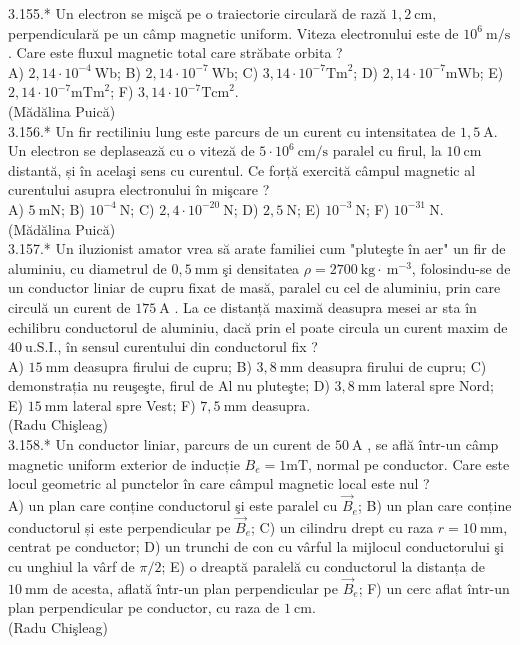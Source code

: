 3.155.* Un electron se mişcă pe o traiectorie circulară de rază $1,2 \mathrm{~cm}$, perpendiculară pe un câmp magnetic uniform. Viteza electronului este de $10^{6} \mathrm{~m} / \mathrm{s}$. Care este fluxul magnetic total care străbate orbita ?\\ A) $2,14 \cdot 10^{-4} \mathrm{~Wb}$; B) $2,14 \cdot 10^{-7} \mathrm{~Wb}$; C) $3,14 \cdot 10^{-7} \mathrm{Tm}^{2}$; D) $2,14 \cdot 10^{-7} \mathrm{mWb}$; E) $2,14 \cdot 10^{-7} \mathrm{mTm}^{2}$; F) $3,14 \cdot 10^{-7} \mathrm{Tcm}^{2}$.\\ (Mădălina Puică)\\

3.156.* Un fir rectiliniu lung este parcurs de un curent cu intensitatea de $1,5 \mathrm{~A}$. Un electron se deplasează cu o viteză de $5 \cdot 10^{6} \mathrm{~cm} / \mathrm{s}$ paralel cu firul, la $10 \mathrm{~cm}$ distantă, și în acelaşi sens cu curentul. Ce forță exercită câmpul magnetic al curentului asupra electronului în mişcare ?\\ A) $5 \mathrm{~mN}$; B) $10^{-4} \mathrm{~N}$; C) $2,4 \cdot 10^{-20} \mathrm{~N}$; D) $2,5 \mathrm{~N}$; E) $10^{-3} \mathrm{~N}$; F) $10^{-31} \mathrm{~N}$.\\ (Mădălina Puică)\\

3.157.* Un iluzionist amator vrea să arate familiei cum "pluteşte în aer" un fir de aluminiu, cu diametrul de $0,5 \mathrm{~mm}$ şi densitatea $\rho=2700 \mathrm{~kg} \cdot \mathrm{~m}^{-3}$, folosindu-se de un conductor liniar de cupru fixat de masă, paralel cu cel de aluminiu, prin care circulă un curent de $175 \mathrm{~A}$ . La ce distanță maximă deasupra mesei ar sta în echilibru conductorul de aluminiu, dacă prin el poate circula un curent maxim de $40 \mathrm{~u.S.I.}$, în sensul curentului din conductorul fix ?\\ A) $15 \mathrm{~mm}$ deasupra firului de cupru; B) $3,8 \mathrm{~mm}$ deasupra firului de cupru; C) demonstrația nu reuşeşte, firul de Al nu pluteşte; D) $3,8 \mathrm{~mm}$ lateral spre Nord; E) $15 \mathrm{~mm}$ lateral spre Vest; F) $7,5 \mathrm{~mm}$ deasupra.\\ (Radu Chişleag)\\

3.158.* Un conductor liniar, parcurs de un curent de $50 \mathrm{~A}$ , se află într-un câmp magnetic uniform exterior de inducție $B_{e}=1 \mathrm{mT}$, normal pe conductor. Care este locul geometric al punctelor în care câmpul magnetic local este nul ?\\ A) un plan care conține conductorul şi este paralel cu $\vec{B}_{e}$; B) un plan care conține conductorul și este perpendicular pe $\vec{B}_{e}$; C) un cilindru drept cu raza $r=10 \mathrm{~mm}$, centrat pe conductor; D) un trunchi de con cu vârful la mijlocul conductorului şi cu unghiul la vârf de $\pi / 2$; E) o dreaptă paralelă cu conductorul la distanța de $10 \mathrm{~mm}$ de acesta, aflată într-un plan perpendicular pe $\vec{B}_{e}$; F) un cerc aflat într-un plan perpendicular pe conductor, cu raza de $1 \mathrm{~cm}$.\\ (Radu Chişleag)\\

